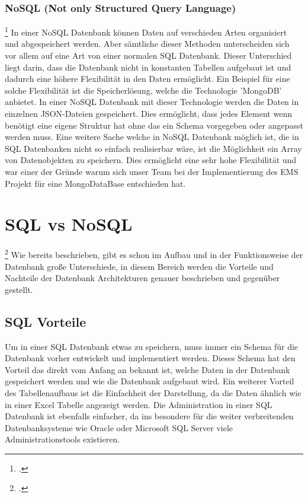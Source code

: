 	\subsubsection{NoSQL (Not only Structured Query Language)}	\footcite{mongodb}
	In einer NoSQL Datenbank können Daten auf verschieden Arten organisiert und abgespeichert werden. Aber sämtliche dieser Methoden unterscheiden sich vor allem auf eine Art von einer normalen SQL Datenbank. 
	Dieser Unterschied liegt darin, dass die Datenbank nicht in konstanten Tabellen aufgebaut ist und dadurch eine höhere Flexibilität in den Daten ermöglicht. 
	Ein Beispiel für eine solche Flexibilität ist die Speicherlösung, welche die Technologie 'MongoDB' anbietet. In einer NoSQL Datenbank mit dieser Technologie werden die Daten in einzelnen JSON-Dateien gespeichert. 
	Dies ermöglicht, dass jedes Element wenn benötigt eine eigene Struktur hat ohne das ein Schema vorgegeben oder angepasst werden muss. 
	Eine weitere Sache welche in NoSQL Datenbank möglich ist, die in SQL Datenbanken nicht so einfach realisierbar wäre, ist die Möglichkeit ein Array von Datenobjekten zu speichern. 
	Dies ermöglicht eine sehr hohe Flexibilität und war einer der Gründe warum sich unser Team bei der Implementierung des EMS Projekt für eine MongoDataBase entschieden hat.
	\section{SQL vs NoSQL} \footcite{sqlvsnosql}
		Wie bereits beschrieben, gibt es schon im Aufbau und in der Funktionsweise der Datenbank große Unterschiede, in diesem Bereich werden die Vorteile und Nachteile der Datenbank Architekturen genauer beschrieben und gegenüber gestellt.
	\subsection{SQL Vorteile}
		Um in einer SQL Datenbank etwas zu speichern, muss immer ein Schema für die Datenbank vorher entwickelt und implementiert werden. 
		Dieses Schema hat den Vorteil das direkt vom Anfang an bekannt ist, welche Daten in der Datenbank gespeichert werden und wie die Datenbank aufgebaut wird. 
		Ein weiterer Vorteil des Tabellenaufbaus ist die Einfachheit der Darstellung, da die Daten ähnlich wie in einer Excel Tabelle angezeigt werden. 
		Die Administration in einer SQL Datenbank ist ebenfalls einfacher, da ins besondere für die weiter verbreitenden Datenbanksysteme wie Oracle oder Microsoft SQL Server viele Administrationstools existieren.
